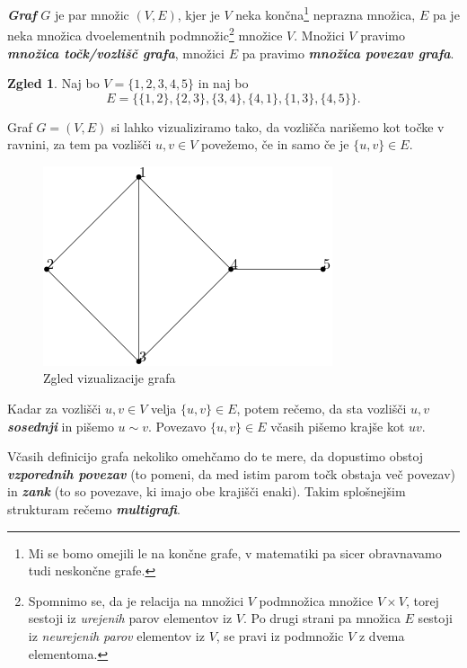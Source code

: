 \documentclass[11pt]{book}
\def\definicija{\color{rdeca}\bf\em}
\theoremstyle{definition}
\theoremstyle{zgled}
\newtheorem*{zgled}{Zgled}
\theoremstyle{odprtproblem}
\theoremstyle{domacanaloga}
\theoremstyle{izrek}
\begin{document}
{\definicija Graf} $G$ je par množic $(V,E)$, kjer je $V$ neka končna\footnote{Mi se bomo omejili le na končne grafe, v matematiki pa sicer obravnavamo tudi neskončne grafe.} neprazna množica, $E$ pa je neka množica dvoelementnih podmnožic\footnote{Spomnimo se, da je relacija na množici $V$ podmnožica množice $V \times V$, torej sestoji iz \emph{urejenih} parov elementov iz $V$. Po drugi strani pa množica $E$ sestoji iz \emph{neurejenih parov} elementov iz $V$, se pravi iz podmnožic $V$ z dvema elementoma.} množice $V$. Množici $V$ pravimo {\definicija množica točk/vozlišč grafa}, množici $E$ pa pravimo {\definicija množica povezav grafa}.

\begin{zgled}
Naj bo $V = \{ 1, 2, 3, 4, 5 \}$ in naj bo
\[
    E = \{  
        \{ 1, 2 \}, 
        \{ 2, 3 \},
        \{ 3, 4 \},
        \{ 4, 1 \},
        \{ 1, 3 \},
        \{ 4, 5 \}
         \}.
\]

Graf $G = (V,E)$ si lahko vizualiziramo tako, da vozlišča narišemo kot točke v ravnini, za tem pa vozlišči $u,v \in V$ povežemo, če in samo če je $\{ u, v \} \in E$.

\begin{figure}[h]
    \centering
    \includegraphics[width=0.5\linewidth]{img/grafi-prvizgled.png}
    \caption{Zgled vizualizacije grafa}
\end{figure}

\end{zgled}

Kadar za vozlišči $u,v \in V$ velja $\{ u, v \} \in E$, potem rečemo, da sta vozlišči $u,v$ {\definicija sosednji} in pišemo $u \sim v$. Povezavo $\{ u, v \} \in E$ včasih pišemo krajše kot $uv$.

Včasih definicijo grafa nekoliko omehčamo do te mere, da dopustimo obstoj {\definicija vzporednih povezav} (to pomeni, da med istim parom točk obstaja več povezav) in {\definicija zank} (to so povezave, ki imajo obe krajišči enaki). Takim splošnejšim strukturam rečemo {\definicija multigrafi}.
\end{document}
